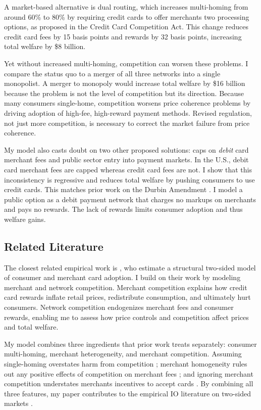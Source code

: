 \documentclass[main.tex]{subfiles}
\begin{document}
A market-based alternative is dual routing, which increases multi-homing from around 60\% to 80\% by requiring credit cards to offer merchants two processing options, as proposed in the Credit Card Competition Act. 
This change reduces credit card fees by 15 basis points and rewards by 32 basis points, increasing total welfare by \$8 billion. 

Yet without increased multi-homing, competition can worsen these problems.
I compare the status quo to a merger of all three networks into a single monopolist.
A merger to monopoly would increase total welfare by \$16 billion because the problem is not the level of competition but its direction.
Because many consumers single-home, competition worsens price coherence problems by driving adoption of high-fee, high-reward payment methods.
Revised regulation, not just more competition, is necessary to correct the market failure from price coherence.

My model also casts doubt on two other proposed solutions: caps on \emph{debit} card merchant fees and public sector entry into payment markets.
In the U.S., debit card merchant fees are capped whereas credit card fees are not.
I show that this inconsistency is regressive and reduces total welfare by pushing consumers to use credit cards.
This matches prior work on the Durbin Amendment \parencite{Mukharlyamov.Sarin2025}.
I model a public option as a debit payment network that charges no markups on merchants and pays no rewards.
The lack of rewards limits consumer adoption and thus welfare gains.

\subsection{Related Literature}

The closest related empirical work is \textcite*{Huynh.etal2022}, who estimate a structural two-sided model of consumer and merchant card adoption.
I build on their work by modeling merchant and network competition.
Merchant competition explains how credit card rewards inflate retail prices, redistribute consumption, and ultimately hurt consumers.
Network competition endogenizes merchant fees and consumer rewards, enabling me to assess how price controls and competition affect prices and total welfare.

My model combines three ingredients that prior work treats separately: consumer multi-homing, merchant heterogeneity, and merchant competition.
Assuming single-homing overstates harm from competition \parencite{Edelman.Wright2015, Anderson.etal2018, Bakos.Halaburda2020, Teh.etal2022}; merchant homogeneity rules out any positive effects of competition on merchant fees \parencite{Rochet.Tirole2011, Guthrie.Wright2007}; and ignoring merchant competition understates merchants incentives to accept cards \parencite{Rochet.Tirole2003, Wright2012,Li.etal2020}.
By combining all three features, my paper contributes to the empirical IO literature on two-sided markets \parencite{Rysman2004, Lee2013, Rosaia2020, Song2021}.
\end{document}
